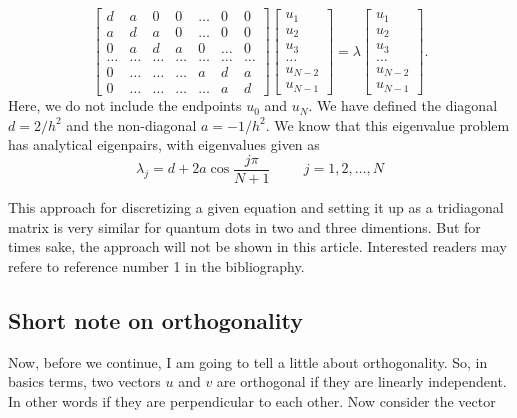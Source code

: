 \documentclass{article}
\begin{document}
\begin{equation}
    \begin{bmatrix} d& a & 0   & 0    & \dots  &0     & 0 \\
                                a & d & a & 0    & \dots  &0     &0 \\
                                0   & a & d & a  &0       &\dots & 0\\
                                \dots  & \dots & \dots & \dots  &\dots      &\dots & \dots\\
                                0   & \dots & \dots & \dots  &a  &d & a\\
                                0   & \dots & \dots & \dots  &\dots       &a & d\end{bmatrix} 
                                 \begin{bmatrix} u_1 \\ u_2 \\ u_3 \\ \dots \\ u_{N-2} \\ u_{N-1}\end{bmatrix} = \lambda \begin{bmatrix} u_1 \\ u_2 \\ u_3 \\ \dots \\ u_{N-2} \\ u_{N-1}\end{bmatrix} . 
\label{eq:matrixse} 
\end{equation}
Here, we do not include the endpoints $u_0$ and $u_N$. We have defined the diagonal $d=2/h^2$ and the non-diagonal $a=-1/h^2$.
We know that this eigenvalue problem has analytical eigenpairs, with eigenvalues given as 
\begin{equation}
\lambda_j=d+2a\cos{\frac{j\pi}{N+1}}\hspace{1cm}j=1,2,\dots,N
\end{equation}

This approach for discretizing a given equation and setting it up as a tridiagonal matrix is very similar for quantum dots in two and three dimentions. But for times sake, the approach will not be shown in this article. Interested readers may refere to reference number 1 in the bibliography.

\subsection{Short note on orthogonality}
Now, before we continue, I am going to tell a little about orthogonality. So, in basics terms, two vectors $u$ and $v$ are orthogonal if they are linearly independent. In other words if they are perpendicular to each other. Now consider the vector
\end{document}
